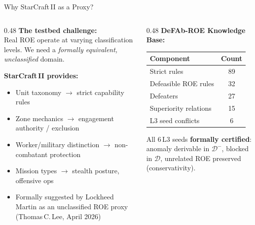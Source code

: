 \documentclass[aspectratio=169, 10pt]{beamer}
\newcommand{\D}{\mathcal{D}}
\begin{document}
\begin{frame}{Why StarCraft\,II as a Proxy?}

  \begin{columns}[T]
    \begin{column}{0.48\textwidth}
      \textbf{The testbed challenge:}\\
      Real ROE operate at varying classification levels.
      We need a \emph{formally equivalent, unclassified} domain.

      \vspace{0.6em}
      \textbf{StarCraft\,II provides:}
      \begin{itemize}[leftmargin=1.2em]
        \item Unit taxonomy \(\rightarrow\) strict capability rules
        \item Zone mechanics \(\rightarrow\) engagement authority / exclusion
        \item Worker/military distinction \(\rightarrow\) non-combatant protection
        \item Mission types \(\rightarrow\) stealth posture, offensive ops
        \item Formally suggested by Lockheed Martin as an unclassified
              ROE proxy (Thomas\,C.\,Lee, April 2026)
      \end{itemize}
    \end{column}

    \begin{column}{0.48\textwidth}
      \textbf{DeFAb-ROE Knowledge Base:}
      \vspace{0.4em}

      \begin{tabular}{@{}lc@{}}
        \toprule
        Component & Count \\
        \midrule
        Strict rules & 89 \\
        Defeasible ROE rules & 32 \\
        Defeaters & 27 \\
        Superiority relations & 15 \\
        L3 seed conflicts & 6 \\
        \bottomrule
      \end{tabular}

      \vspace{0.5em}
      All 6\,L3 seeds \textbf{formally certified}:\\
      anomaly derivable in $\D^-$, blocked in $\D$,
      unrelated ROE preserved (conservativity).
    \end{column}
  \end{columns}
\end{frame}
\end{document}
